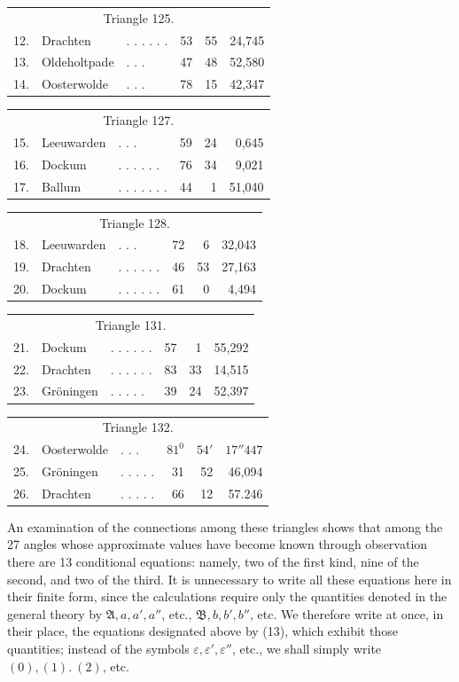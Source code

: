 \begin{center}
\begin{tabular}{r l l r r r}
\multicolumn{6}{c}{Triangle 125.}\\[5pt]
12.&Drachten&. . . . . .&53&55&24,745\\
13.&Oldeholtpade&. . .&47&48&52,580\\
14.&Oosterwolde&. . .&78&15&42,347
\end{tabular}
\end{center}
\begin{center}
\begin{tabular}{r l l r r r}
\multicolumn{6}{c}{Triangle 127.}\\[5pt]
15.&Leeuwarden&. . .&59&24&0,645\\
16.&Dockum&. . . . . .&76&34&9,021\\
17.&Ballum&. . . . . . .&44&1&51,040
\end{tabular}
\end{center}
\begin{center}
\begin{tabular}{r l l r r r}
\multicolumn{6}{c}{Triangle 128.}\\[5pt]
18.&Leeuwarden&. . .&72&6&32,043\\
19.&Drachten&. . . . . .&46&53&27,163\\
20.&Dockum&. . . . . .&61&0&4,494
\end{tabular}
\end{center}
\begin{center}
\begin{tabular}{r l l r r r}
\multicolumn{6}{c}{Triangle 131.}\\[5pt]
21.&Dockum&. . . . . .&57&1&55,292\\
22.&Drachten&. . . . . .&83&33&14,515\\
23.&Gröningen&. . . . .&39&24&52,397
\end{tabular}
\end{center}
\begin{center}
\begin{tabular}{r l l r r r}
\multicolumn{6}{c}{Triangle 132.}\\[5pt]
24.&Oosterwolde&. . .&\(81^0\)&\(54'\)&\(17''447\)\\
25.&Gröningen&. . . . .&31&52&46,094\\
26.&Drachten&. . . . .&66&12&57.246
\end{tabular}
\end{center}

An examination of the connections among these triangles shows that among the 27 angles whose approximate values have become known through observation there are 13 conditional equations: namely, two of the first kind, nine of the second, and two of the third. It is unnecessary to write all these equations here in their finite form, since the calculations require only the quantities denoted in the general theory by \(\mathfrak A,a,a',a''\), etc., \(\mathfrak B,b,b',b''\), etc. We therefore write at once, in their place, the equations designated above by (13), which exhibit those quantities; instead of the symbols \(\varepsilon,\varepsilon',\varepsilon''\), etc., we shall simply write \((0),(1).\ (2)\), etc.

